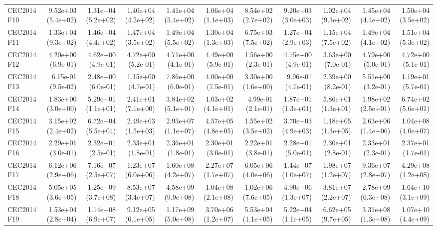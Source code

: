 \begin{longtable}{lrrrrrrrrrr}
CEC2014 F10 & 9.52e+03 (5.4e+02) & 1.31e+04 (5.2e+02) & 1.40e+04 (4.2e+02) & 1.41e+04 (5.4e+02) & 1.06e+04 (1.1e+03) & 8.54e+02 (2.7e+02) & 9.20e+03 (3.0e+03) & 1.02e+04 (9.3e+02) & 1.45e+04 (4.4e+02) & 1.50e+04 (3.5e+02) \\
CEC2014 F11 & 1.33e+04 (9.3e+02) & 1.46e+04 (4.4e+02) & 1.47e+04 (3.5e+02) & 1.49e+04 (5.5e+02) & 1.30e+04 (1.3e+03) & 6.75e+03 (7.5e+02) & 1.27e+04 (2.9e+03) & 1.15e+04 (7.5e+02) & 1.49e+04 (4.1e+02) & 1.51e+04 (5.3e+02) \\
CEC2014 F12 & 4.20e+00 (6.9e-01) & 4.62e+00 (4.9e-01) & 4.72e+00 (5.2e-01) & 4.71e+00 (4.1e-01) & 4.49e+00 (5.9e-01) & 1.56e+00 (2.3e-01) & 4.75e+00 (4.9e-01) & 3.63e+00 (7.0e-01) & 4.79e+00 (5.0e-01) & 4.72e+00 (5.1e-01) \\
CEC2014 F13 & 6.15e-01 (9.5e-02) & 2.48e+00 (6.0e-01) & 1.15e+00 (4.7e-01) & 7.86e+00 (6.0e-01) & 4.00e+00 (7.5e-01) & 3.30e+00 (1.6e+00) & 9.96e-01 (4.7e-01) & 2.39e+00 (8.2e-01) & 5.51e+00 (3.2e-01) & 1.19e+01 (5.7e-01) \\
CEC2014 F14 & 1.83e+00 (3.0e+00) & 5.29e+01 (1.1e+01) & 2.41e+01 (7.1e+00) & 3.84e+02 (5.1e+01) & 1.03e+02 (4.1e+01) & 4.99e-01 (2.1e-01) & 1.87e+01 (1.3e+01) & 5.86e+01 (1.3e+01) & 1.98e+02 (2.5e+01) & 6.74e+02 (5.6e+01) \\
CEC2014 F15 & 3.15e+02 (2.4e+02) & 6.72e+04 (5.5e+04) & 2.49e+03 (1.5e+03) & 2.93e+07 (1.1e+07) & 4.57e+05 (4.8e+05) & 1.55e+02 (3.5e+02) & 3.70e+03 (4.9e+03) & 1.18e+05 (1.3e+05) & 2.63e+06 (1.4e+06) & 1.04e+08 (4.0e+07) \\
CEC2014 F16 & 2.29e+01 (3.0e-01) & 2.32e+01 (2.5e-01) & 2.33e+01 (1.8e-01) & 2.36e+01 (1.8e-01) & 2.30e+01 (3.0e-01) & 2.22e+01 (3.8e-01) & 2.28e+01 (5.0e-01) & 2.30e+01 (2.8e-01) & 2.33e+01 (2.3e-01) & 2.37e+01 (1.7e-01) \\
CEC2014 F17 & 6.12e+06 (2.9e+06) & 7.16e+07 (2.5e+07) & 1.23e+07 (6.0e+06) & 1.60e+08 (4.2e+07) & 2.27e+07 (1.7e+07) & 6.05e+06 (4.0e+06) & 1.44e+07 (1.0e+07) & 1.98e+07 (1.2e+07) & 9.36e+07 (2.8e+07) & 4.29e+08 (1.2e+08) \\
CEC2014 F18 & 5.05e+05 (3.6e+05) & 1.25e+09 (3.7e+08) & 8.53e+07 (3.4e+07) & 4.58e+09 (9.9e+08) & 1.04e+08 (2.1e+08) & 1.02e+06 (7.6e+05) & 4.90e+06 (1.3e+07) & 3.81e+07 (2.2e+07) & 2.78e+09 (6.3e+08) & 1.64e+10 (3.1e+09) \\
CEC2014 F19 & 1.53e+04 (2.8e+04) & 1.14e+08 (6.9e+07) & 9.12e+05 (6.1e+05) & 1.17e+09 (5.0e+08) & 3.70e+06 (1.2e+07) & 5.53e+04 (1.1e+05) & 5.22e+04 (1.1e+05) & 6.62e+05 (9.7e+05) & 3.31e+08 (1.3e+08) & 1.07e+10 (4.4e+09) \\

\end{longtable}
